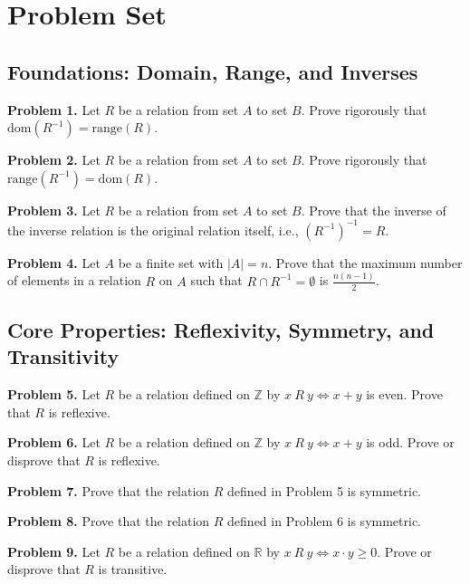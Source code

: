 \documentclass[11pt, a4paper]{article}
\theoremstyle{definition}
\theoremstyle{remark}
\newcommand{\R}{\mathbb{R}}
\newcommand{\Z}{\mathbb{Z}}
\begin{document}
\newpage

\section{Problem Set}

\subsection{Foundations: Domain, Range, and Inverses}
\textbf{Problem 1.} Let $R$ be a relation from set $A$ to set $B$. Prove rigorously that $\mathrm{dom}(R^{-1}) = \mathrm{range}(R)$.

\vspace{0.5em}
\noindent
\textbf{Problem 2.} Let $R$ be a relation from set $A$ to set $B$. Prove rigorously that $\mathrm{range}(R^{-1}) = \mathrm{dom}(R)$.

\vspace{0.5em}
\noindent
\textbf{Problem 3.} Let $R$ be a relation from set $A$ to set $B$. Prove that the inverse of the inverse relation is the original relation itself, i.e., $(R^{-1})^{-1} = R$.

\vspace{0.5em}
\noindent
\textbf{Problem 4.} Let $A$ be a finite set with $|A| = n$. Prove that the maximum number of elements in a relation $R$ on $A$ such that $R \cap R^{-1} = \emptyset$ is $\frac{n(n-1)}{2}$.

\subsection{Core Properties: Reflexivity, Symmetry, and Transitivity}
\textbf{Problem 5.} Let $R$ be a relation defined on $\Z$ by $x \ R \ y \iff x + y$ is even. Prove that $R$ is reflexive.

\vspace{0.5em}
\noindent
\textbf{Problem 6.} Let $R$ be a relation defined on $\Z$ by $x \ R \ y \iff x + y$ is odd. Prove or disprove that $R$ is reflexive.

\vspace{0.5em}
\noindent
\textbf{Problem 7.} Prove that the relation $R$ defined in Problem 5 is symmetric.

\vspace{0.5em}
\noindent
\textbf{Problem 8.} Prove that the relation $R$ defined in Problem 6 is symmetric.

\vspace{0.5em}
\noindent
\textbf{Problem 9.} Let $R$ be a relation defined on $\R$ by $x \ R \ y \iff x \cdot y \ge 0$. Prove or disprove that $R$ is transitive.
\end{document}

